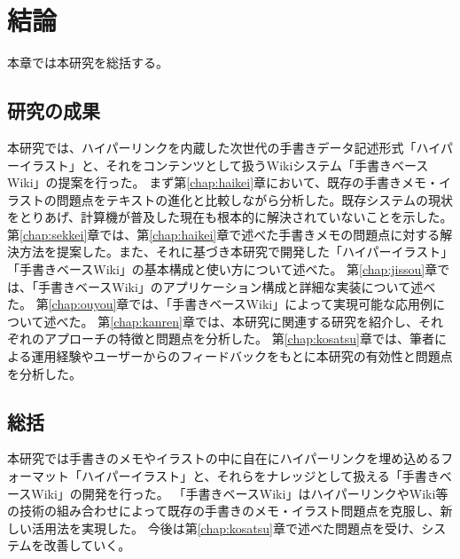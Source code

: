 \chapter{結論}
\label{chap:kekka}

本章では本研究を総括する。

\newpage

\section{研究の成果}
本研究では、ハイパーリンクを内蔵した次世代の手書きデータ記述形式「ハイパーイラスト」と、それをコンテンツとして扱うWikiシステム「手書きベースWiki」の提案を行った。
まず第\ref{chap:haikei}章において、既存の手書きメモ・イラストの問題点をテキストの進化と比較しながら分析した。既存システムの現状をとりあげ、計算機が普及した現在も根本的に解決されていないことを示した。
第\ref{chap:sekkei}章では、第\ref{chap:haikei}章で述べた手書きメモの問題点に対する解決方法を提案した。また、それに基づき本研究で開発した「ハイパーイラスト」「手書きベースWiki」の基本構成と使い方について述べた。
第\ref{chap:jissou}章では、「手書きベースWiki」のアプリケーション構成と詳細な実装について述べた。
第\ref{chap:ouyou}章では、「手書きベースWiki」によって実現可能な応用例について述べた。
第\ref{chap:kanren}章では、本研究に関連する研究を紹介し、それぞれのアプローチの特徴と問題点を分析した。
第\ref{chap:kosatsu}章では、筆者による運用経験やユーザーからのフィードバックをもとに本研究の有効性と問題点を分析した。

\section{総括}
本研究では手書きのメモやイラストの中に自在にハイパーリンクを埋め込めるフォーマット「ハイパーイラスト」と、それらをナレッジとして扱える「手書きベースWiki」の開発を行った。
「手書きベースWiki」はハイパーリンクやWiki等の技術の組み合わせによって既存の手書きのメモ・イラスト問題点を克服し、新しい活用法を実現した。
今後は第\ref{chap:kosatsu}章で述べた問題点を受け、システムを改善していく。